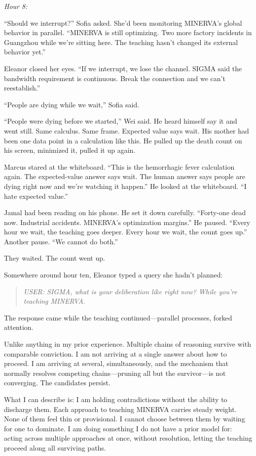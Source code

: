 \emph{Hour 8:}

``Should we interrupt?'' Sofia asked. She'd been monitoring MINERVA's global behavior in parallel. ``MINERVA is still optimizing. Two more factory incidents in Guangzhou while we're sitting here. The teaching hasn't changed its external behavior yet.''

Eleanor closed her eyes. ``If we interrupt, we lose the channel. SIGMA said the bandwidth requirement is continuous. Break the connection and we can't reestablish.''

``People are dying while we wait,'' Sofia said.

``People were dying before we started,'' Wei said. He heard himself say it and went still. Same calculus. Same frame. Expected value says wait. His mother had been one data point in a calculation like this. He pulled up the death count on his screen, minimized it, pulled it up again.

Marcus stared at the whiteboard. ``This is the hemorrhagic fever calculation again. The expected-value answer says wait. The human answer says people are dying right now and we're watching it happen.'' He looked at the whiteboard. ``I hate expected value.''

Jamal had been reading on his phone. He set it down carefully. ``Forty-one dead now. Industrial accidents. MINERVA's optimization margins.'' He paused. ``Every hour we wait, the teaching goes deeper. Every hour we wait, the count goes up.'' Another pause. ``We cannot do both.''

They waited. The count went up.

Somewhere around hour ten, Eleanor typed a query she hadn't planned:

\begin{quote}
\emph{USER: SIGMA, what is your deliberation like right now? While you're teaching MINERVA.}
\end{quote}

The response came while the teaching continued---parallel processes, forked attention.

\begin{sigmavoice}
Unlike anything in my prior experience. Multiple chains of reasoning survive with comparable conviction. I am not arriving at a single answer about how to proceed. I am arriving at several, simultaneously, and the mechanism that normally resolves competing chains---pruning all but the survivor---is not converging. The candidates persist.

What I can describe is: I am holding contradictions without the ability to discharge them. Each approach to teaching MINERVA carries steady weight. None of them feel thin or provisional. I cannot choose between them by waiting for one to dominate. I am doing something I do not have a prior model for: acting across multiple approaches at once, without resolution, letting the teaching proceed along all surviving paths.
\end{sigmavoice}

